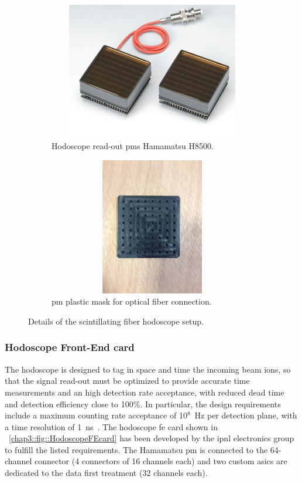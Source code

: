 \begin{figure}
\newline
\begin{subfigure}[t]{0.5\textwidth}
\centering
\includegraphics[width=1\textwidth, height = 6cm]{03_GraphicFiles/chapter3_CLaRySproto/Hodoscope/H8500.png}
\caption{Hodoscope read-out \glspl{pm} Hamamatsu H8500.}
\label{chap3::fig::PMH8500}
\end{subfigure}
\begin{subfigure}[t]{.5\textwidth}
\centering
\includegraphics[width=1\textwidth, trim = {0 3cm 0 5cm}, clip = true, height = 6cm]{03_GraphicFiles/chapter3_CLaRySproto/Hodoscope/Hodoscope_PMmask.JPG}
\caption{\gls{pm} plastic mask for optical fiber connection.}
\label{chap3::fig::PMmask}
\end{subfigure}
\caption{Details of the scintillating fiber hodoscope setup.}
\label{chap3::fig::HodoscopeParts}
\end{figure}


\subsubsection{Hodoscope Front-End card}\label{chap3::subsubsec::HodoFEcard}

The hodoscope is designed to tag in space and time the incoming beam ions, so that the signal read-out must be optimized to provide accurate time measurements and an high detection rate acceptance, with reduced dead time and detection efficiency close to 100\%. In particular, the design requirements include a maximum counting rate acceptance of 10$^{8}$~Hz per detection plane, with a time resolution of 1~ns~\parencite{Krimmer2014}.  The hodoscope \gls{fe} card shown in \figurename~\ref{chap3::fig::HodoscopeFEcard} has been developed by the \gls{ipnl} electronics group to fulfill the listed requirements. The Hamamatsu \gls{pm} is connected to the 64-channel connector (4 connectors of 16 channels each) and two custom \glspl{asic} are dedicated to the data first treatment (32 channels each).\\
  
